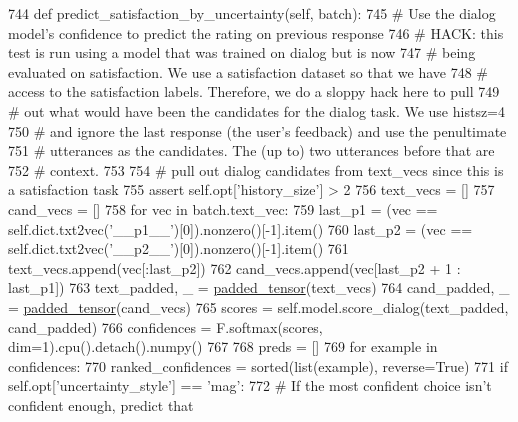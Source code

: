 \begin{DoxyCode}
744     \textcolor{keyword}{def }predict\_satisfaction\_by\_uncertainty(self, batch):
745         \textcolor{comment}{# Use the dialog model's confidence to predict the rating on previous response}
746         \textcolor{comment}{# HACK: this test is run using a model that was trained on dialog but is now}
747         \textcolor{comment}{# being evaluated on satisfaction. We use a satisfaction dataset so that we have}
748         \textcolor{comment}{# access to the satisfaction labels. Therefore, we do a sloppy hack here to pull}
749         \textcolor{comment}{# out what would have been the candidates for the dialog task. We use histsz=4}
750         \textcolor{comment}{# and ignore the last response (the user's feedback) and use the penultimate}
751         \textcolor{comment}{# utterances as the candidates. The (up to) two utterances before that are}
752         \textcolor{comment}{# context.}
753 
754         \textcolor{comment}{# pull out dialog candidates from text\_vecs since this is a satisfaction task}
755         \textcolor{keyword}{assert} self.opt[\textcolor{stringliteral}{'history\_size'}] > 2
756         text\_vecs = []
757         cand\_vecs = []
758         \textcolor{keywordflow}{for} vec \textcolor{keywordflow}{in} batch.text\_vec:
759             last\_p1 = (vec == self.dict.txt2vec(\textcolor{stringliteral}{'\_\_p1\_\_'})[0]).nonzero()[-1].item()
760             last\_p2 = (vec == self.dict.txt2vec(\textcolor{stringliteral}{'\_\_p2\_\_'})[0]).nonzero()[-1].item()
761             text\_vecs.append(vec[:last\_p2])
762             cand\_vecs.append(vec[last\_p2 + 1 : last\_p1])
763         text\_padded, \_ = \hyperlink{namespaceparlai_1_1agents_1_1legacy__agents_1_1seq2seq_1_1utils__v1_adb5a414ae439f14c54e8c760b91cc4c8}{padded\_tensor}(text\_vecs)
764         cand\_padded, \_ = \hyperlink{namespaceparlai_1_1agents_1_1legacy__agents_1_1seq2seq_1_1utils__v1_adb5a414ae439f14c54e8c760b91cc4c8}{padded\_tensor}(cand\_vecs)
765         scores = self.model.score\_dialog(text\_padded, cand\_padded)
766         confidences = F.softmax(scores, dim=1).cpu().detach().numpy()
767 
768         preds = []
769         \textcolor{keywordflow}{for} example \textcolor{keywordflow}{in} confidences:
770             ranked\_confidences = sorted(list(example), reverse=\textcolor{keyword}{True})
771             \textcolor{keywordflow}{if} self.opt[\textcolor{stringliteral}{'uncertainty\_style'}] == \textcolor{stringliteral}{'mag'}:
772                 \textcolor{comment}{# If the most confident choice isn't confident enough, predict that}

\end{DoxyCode}

